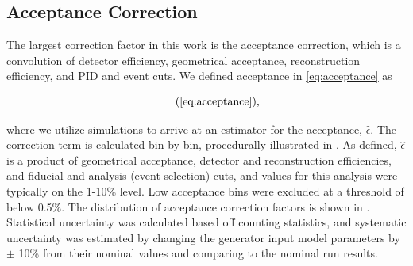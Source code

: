 \subsection{Acceptance Correction}
The largest correction factor in this work is the acceptance correction, which is a convolution of detector efficiency, geometrical acceptance, reconstruction efficiency, and PID and event cuts. We defined acceptance in \eqref{eq:acceptance} as

    \begin{equation*}
      \recallLabel{eq:acceptance},
    \end{equation*}

where we utilize simulations to arrive at an estimator for the acceptance, $\hat{\epsilon}$. The correction term is calculated bin-by-bin, procedurally illustrated in . As defined, $\hat{\epsilon}$ is a product of geometrical acceptance, detector and reconstruction efficiencies, and fiducial and analysis (event selection) cuts, and values for this analysis were typically on the 1-10\% level. Low acceptance bins were excluded at a threshold of below 0.5\%. The distribution of acceptance correction factors is shown in . Statistical uncertainty was calculated based off counting statistics, and systematic uncertainty was estimated by changing the generator input model parameters by $\pm$ 10\% from their nominal values and comparing to the nominal run results. 

